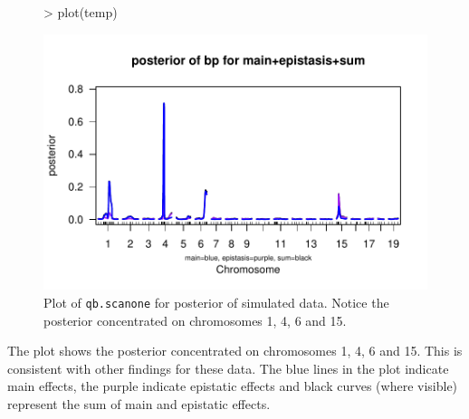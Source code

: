 \documentclass[12pt]{article}
\begin{document}
\begin{figure}
\begin{Schunk}
\begin{Sinput}
> plot(temp)
\end{Sinput}
\end{Schunk}
\includegraphics{scanPDF/FIG-Scanone-HyperPost}
\caption{Plot of {\tt qb.scanone} for posterior of simulated data.  Notice 
the posterior concentrated on chromosomes 1, 4, 6 and 15.}
\end{figure}
The plot shows the posterior concentrated on chromosomes 1, 4, 6 and
15. This is consistent with other findings for these data.
The blue lines in the plot indicate main effects, the 
purple indicate epistatic effects and black curves (where visible) 
represent the sum of main and epistatic effects.   
\end{document}
